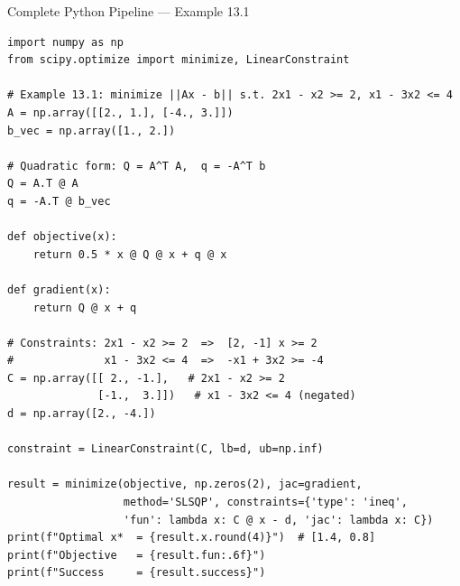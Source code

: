 \documentclass[aspectratio=169,10pt]{beamer}
\begin{document}
\begin{frame}[fragile]{Complete Python Pipeline --- Example 13.1}
\begin{lstlisting}[caption={Full QP solution pipeline in Python using scipy.optimize.minimize}]
import numpy as np
from scipy.optimize import minimize, LinearConstraint

# Example 13.1: minimize ||Ax - b|| s.t. 2x1 - x2 >= 2, x1 - 3x2 <= 4
A = np.array([[2., 1.], [-4., 3.]])
b_vec = np.array([1., 2.])

# Quadratic form: Q = A^T A,  q = -A^T b
Q = A.T @ A
q = -A.T @ b_vec

def objective(x):
    return 0.5 * x @ Q @ x + q @ x

def gradient(x):
    return Q @ x + q

# Constraints: 2x1 - x2 >= 2  =>  [2, -1] x >= 2
#              x1 - 3x2 <= 4  =>  -x1 + 3x2 >= -4
C = np.array([[ 2., -1.],   # 2x1 - x2 >= 2
              [-1.,  3.]])   # x1 - 3x2 <= 4 (negated)
d = np.array([2., -4.])

constraint = LinearConstraint(C, lb=d, ub=np.inf)

result = minimize(objective, np.zeros(2), jac=gradient,
                  method='SLSQP', constraints={'type': 'ineq',
                  'fun': lambda x: C @ x - d, 'jac': lambda x: C})
print(f"Optimal x*  = {result.x.round(4)}")  # [1.4, 0.8]
print(f"Objective   = {result.fun:.6f}")
print(f"Success     = {result.success}")
\end{lstlisting}
\end{frame}
\end{document}
